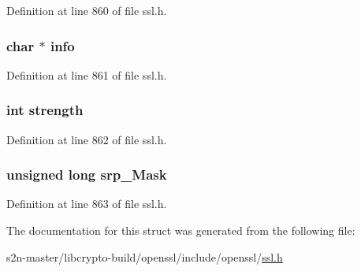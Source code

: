 Definition at line 860 of file ssl.\+h.

\subsubsection[{\texorpdfstring{info}{info}}]{\setlength{\rightskip}{0pt plus 5cm}char $\ast$ info}\hypertarget{structsrp__ctx__st_abd59b785f164cf0a2612687a73c5e81d}{}\label{structsrp__ctx__st_abd59b785f164cf0a2612687a73c5e81d}


Definition at line 861 of file ssl.\+h.

\subsubsection[{\texorpdfstring{strength}{strength}}]{\setlength{\rightskip}{0pt plus 5cm}int strength}\hypertarget{structsrp__ctx__st_af0114dc9171a9bdc183e54e510bd861d}{}\label{structsrp__ctx__st_af0114dc9171a9bdc183e54e510bd861d}


Definition at line 862 of file ssl.\+h.

\subsubsection[{\texorpdfstring{srp\+\_\+\+Mask}{srp_Mask}}]{\setlength{\rightskip}{0pt plus 5cm}unsigned long srp\+\_\+\+Mask}\hypertarget{structsrp__ctx__st_ae86899fd34e812bcbf65e3e60fc52894}{}\label{structsrp__ctx__st_ae86899fd34e812bcbf65e3e60fc52894}


Definition at line 863 of file ssl.\+h.



The documentation for this struct was generated from the following file\+:\begin{DoxyCompactItemize}
\item 
s2n-\/master/libcrypto-\/build/openssl/include/openssl/\hyperlink{include_2openssl_2ssl_8h}{ssl.\+h}\end{DoxyCompactItemize}
